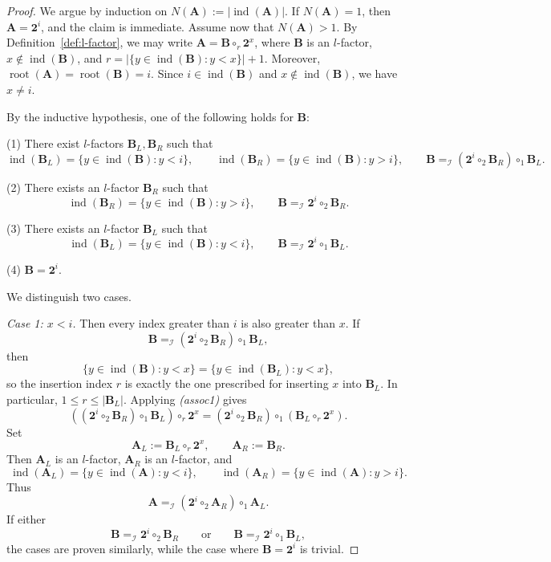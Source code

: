 \documentclass[a4paper]{article}
\theoremstyle{plain}
\theoremstyle{definition}
\theoremstyle{remark}
\numberwithin{equation}{section}
\renewcommand{\le}{\leqslant}\renewcommand{\ge}{\geqslant}
\begin{document}
\begin{proof}
We argue by induction on $N(\mathbf A):=\bigl|\operatorname{ind}(\mathbf A)\bigr|$. If \(N(\mathbf A)=1\), then \(\mathbf A=\mathbf 2^{i}\), and the claim is immediate. Assume now that \(N(\mathbf A)>1\). By Definition~\ref{def:l-factor}, we may write $\mathbf A=\mathbf B\circ_r \mathbf 2^x$, where \(\mathbf B\) is an \(l\)-factor, \(x\notin\operatorname{ind}(\mathbf B)\), and $r=\bigl|\{y\in\operatorname{ind}(\mathbf B):y<x\}\bigr|+1$. Moreover, $\operatorname{root}(\mathbf A)=\operatorname{root}(\mathbf B)=i$. Since \(i\in\operatorname{ind}(\mathbf B)\) and \(x\notin\operatorname{ind}(\mathbf B)\), we have $x\neq i$.

By the inductive hypothesis, one of the following holds for \(\mathbf B\):

\noindent (1) There exist \(l\)-factors \(\mathbf B_L,\mathbf B_R\) such that
\[
\operatorname{ind}(\mathbf B_L)=\{y\in\operatorname{ind}(\mathbf B):y<i\},\qquad
\operatorname{ind}(\mathbf B_R)=\{y\in\operatorname{ind}(\mathbf B):y>i\},\qquad
\mathbf B =_{\mathcal I} (\mathbf 2^{i}\circ_2 \mathbf B_R)\circ_1 \mathbf B_L.
\]

\noindent (2) There exists an \(l\)-factor \(\mathbf B_R\) such that
\[
\operatorname{ind}(\mathbf B_R)=\{y\in\operatorname{ind}(\mathbf B):y>i\},\qquad
\mathbf B =_{\mathcal I} \mathbf 2^{i}\circ_2 \mathbf B_R.
\]

\noindent (3) There exists an \(l\)-factor \(\mathbf B_L\) such that
\[
\operatorname{ind}(\mathbf B_L)=\{y\in\operatorname{ind}(\mathbf B):y<i\},\qquad
\mathbf B =_{\mathcal I} \mathbf 2^{i}\circ_1 \mathbf B_L.
\]

\noindent (4) \(\mathbf B=\mathbf 2^{i}\).

We distinguish two cases.

\medskip
\noindent\emph{Case 1: \(x<i\).}
Then every index greater than \(i\) is also greater than \(x\). If
\[
\mathbf B =_{\mathcal I} (\mathbf 2^{i}\circ_2 \mathbf B_R)\circ_1 \mathbf B_L,
\]
then
\[
\{y\in\operatorname{ind}(\mathbf B):y<x\}
=
\{y\in\operatorname{ind}(\mathbf B_L):y<x\},
\]
so the insertion index \(r\) is exactly the one prescribed for inserting \(x\) into \(\mathbf B_L\). In particular, $1\le r\le |\mathbf B_L|$.
Applying \emph{(assoc1)} gives
\[
((\mathbf 2^{i}\circ_2 \mathbf B_R)\circ_1 \mathbf B_L)\circ_r \mathbf 2^x
=
(\mathbf 2^{i}\circ_2 \mathbf B_R)\circ_1(\mathbf B_L\circ_r \mathbf 2^x).
\]
Set
\[
\mathbf A_L:=\mathbf B_L\circ_r \mathbf 2^x,
\qquad
\mathbf A_R:=\mathbf B_R.
\]
Then \(\mathbf A_L\) is an \(l\)-factor, \(\mathbf A_R\) is an \(l\)-factor, and
\[
\operatorname{ind}(\mathbf A_L)=\{y\in\operatorname{ind}(\mathbf A):y<i\},
\qquad
\operatorname{ind}(\mathbf A_R)=\{y\in\operatorname{ind}(\mathbf A):y>i\}.
\]
Thus
\[
\mathbf A =_{\mathcal I} (\mathbf 2^{i}\circ_2 \mathbf A_R)\circ_1 \mathbf A_L.
\]
If either 
\[
\mathbf B =_{\mathcal I} \mathbf 2^{i}\circ_2 \mathbf B_R \qquad \text{or} \qquad \mathbf B =_{\mathcal I} \mathbf 2^{i}\circ_1 \mathbf B_L,
\]
the cases are proven similarly, while the case where \(\mathbf B=\mathbf 2^{i}\) is trivial.


\end{proof}
\end{document}
